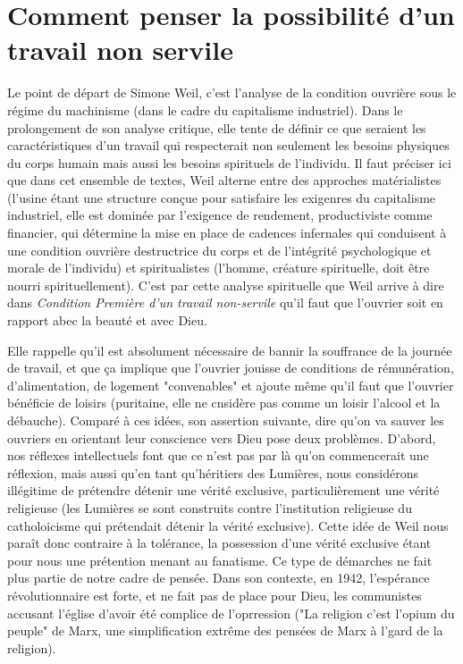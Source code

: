 \documentclass[a4paper,12pt]{book}
\begin{document}
\section{Comment penser la possibilité d'un travail non servile}
Le point de départ de Simone Weil, c'est l'analyse de la condition ouvrière sous le régime du machinisme (dans le cadre du capitalisme industriel). Dans le prolongement de son analyse critique, elle tente de définir ce que seraient les caractéristiques d'un travail qui respecterait non seulement les besoins physiques du corps humain mais aussi les besoins spirituels de l'individu. Il faut préciser ici que dans cet ensemble de textes, Weil alterne entre des approches matérialistes (l'usine étant une structure conçue pour satisfaire les exigenres du capitalisme industriel, elle est dominée par l'exigence de rendement, productiviste comme financier, qui détermine la mise en place de cadences infernales qui conduisent à une condition ouvrière destructrice du corps et de l'intégrité psychologique et morale de l'individu) et spiritualistes (l'homme, créature spirituelle, doit être nourri spirituellement). C'est par cette analyse spirituelle que Weil arrive à dire dans \textit{Condition Première d'un travail non-servile} qu'il faut que l'ouvrier soit en rapport abec la beauté et avec Dieu.
\par Elle rappelle qu'il est absolument nécessaire de bannir la souffrance de la journée de travail, et que ça implique que l'ouvrier jouisse de conditions de rémunération, d'alimentation, de logement "convenables" et ajoute même qu'il faut que l'ouvrier bénéficie de loisirs (puritaine, elle ne cnsidère pas comme un loisir l'alcool et la débauche). Comparé à ces idées, son assertion suivante, dire qu'on va sauver les ouvriers en orientant leur conscience vers Dieu pose deux problèmes. D'abord, nos réflexes intellectuels font que ce n'est pas par là qu'on commencerait une réflexion, mais aussi qu'en tant qu'héritiers des Lumières, nous considérons illégitime de prétendre détenir une vérité exclusive, particulièrement une vérité religieuse (les Lumières se sont construits contre l'institution religieuse du catholoicisme qui prétendait détenir la vérité exclusive). Cette idée de Weil nous paraît donc contraire à la tolérance, la possession d'une vérité exclusive étant pour nous une prétention menant au fanatisme. Ce type de démarches ne fait plus partie de notre cadre de pensée. Dans son contexte, en 1942, l'espérance révolutionnaire est forte, et ne fait pas de place pour Dieu, les communistes accusant l'église d'avoir été complice de l'oprression ("La religion c'est l'opium du peuple" de Marx, une simplification extrême des pensées de Marx à l'gard de la religion).
\end{document}
